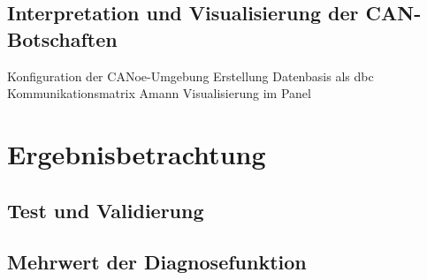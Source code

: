 \subsection{Interpretation und Visualisierung der CAN-Botschaften}
Konfiguration der CANoe-Umgebung
Erstellung Datenbasis als dbc
Kommunikationsmatrix Amann
Visualisierung im Panel


\begin{comment}
	Dummy-Botschaften über Python, ...
	Skriptsprache Python
	Package python-can
	Einbindung in ROS --> neuer Knoten
	Abonnieren sämtlicher Knoten
	Besonderheit callback-Funktion
	Deabonnieren, wenn Diagnose passiv ist
	Programmablaufplan
	Datentypen: Variablen in char Arrays wandeln
	IEEE Umrechnung von float-Variablen
	Empfänger: 	Datenbasis als dbc.File
	Visualisierung in Diagnose-Panel
	Timing (eher in kritische Betrachtung, globales Timing angepasst)
	
	\begin{figure}[!htbp]
	\centering
	\texttt{[image: ./Diagnose-Kommunikationsprinzip]}
	\caption{ASAM/ISO-Diagnose-Server-Prinzip (Kommunikationsprinzip) [Reif]}
	\label{abb:DiagnoseKommunkationsprinzip}
	\end{figure}
	
\end{comment}





\section{Ergebnisbetrachtung} \label{sec:ErgebnisDiagnose} %

\subsection{Test und Validierung} \label{subsec:TestValidierungDiagnose}
\subsection{Mehrwert der Diagnosefunktion} \label{subsec:MehrwertDiagnose}



